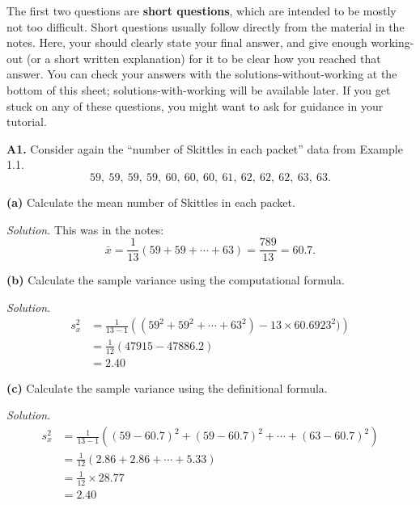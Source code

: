 \documentclass[
  a4paper,
]{book}
\theoremstyle{definition}
\theoremstyle{definition}
\theoremstyle{definition}
\theoremstyle{definition}
\theoremstyle{remark}
\begin{document}
The first two questions are \textbf{short questions}, which are intended to be mostly not too difficult. Short questions usually follow directly from the material in the notes. Here, your should clearly state your final answer, and give enough working-out (or a short written explanation) for it to be clear how you reached that answer. You can check your answers with the solutions-without-working at the bottom of this sheet; solutions-with-working will be available later. If you get stuck on any of these questions, you might want to ask for guidance in your tutorial.

\textbf{A1.} Consider again the ``number of Skittles in each packet'' data from Example 1.1.
\[ 59, \ 59, \ 59, \ 59, \ 60, \ 60, \ 60, \ 61, \ 62, \ 62, \ 62, \ 63, \ 63 .\]

\textbf{(a)} Calculate the mean number of Skittles in each packet.

\begin{myanswers}
\emph{Solution.}
This was in the notes:
\[ \bar x = \frac{1}{13} (59 + 59 + \cdots + 63) =  \frac{789}{13} = 60.7 .\]

\end{myanswers}

\textbf{(b)} Calculate the sample variance using the computational formula.

\begin{myanswers}
\emph{Solution.}
\begin{align*}
  s_x^2 &= \frac{1}{13 - 1} \left( (59^2 + 59^2 + \cdots + 63^2) - 13 \times 60.6923^2)\right) \\
        &= \frac{1}{12} (47915 - 47886.2) \\
        &= 2.40
\end{align*}

\end{myanswers}

\textbf{(c)} Calculate the sample variance using the definitional formula.

\begin{myanswers}
\emph{Solution.}
\begin{align*}
  s_x^2 &= \frac{1}{13 - 1} \left( (59 - 60.7)^2 + (59 - 60.7)^2 + \cdots + (63 - 60.7)^2 \right) \\
        &= \frac{1}{12} (2.86 + 2.86 + \cdots + 5.33) \\
        &= \frac{1}{12} \times 28.77 \\
        &= 2.40
\end{align*}

\end{myanswers}
\end{document}
